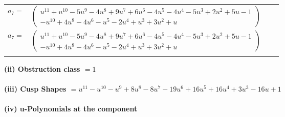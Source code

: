 \documentclass[1p]{elsarticle_modified}
\theoremstyle{definition}
\begin{document}
\begin{tabular}{m{7pt} m{180pt} m{7pt} m{180pt} }
\flushright $a_{7}=$&$\begin{pmatrix}u^{11}+u^{10}-5 u^9-4 u^8+9 u^7+6 u^6-4 u^5-4 u^4-5 u^3+2 u^2+5 u-1\\- u^{10}+4 u^8-4 u^6- u^5-2 u^4+u^3+3 u^2+u\end{pmatrix}$\\ \flushright $a_{7}=$&$\begin{pmatrix}u^{11}+u^{10}-5 u^9-4 u^8+9 u^7+6 u^6-4 u^5-4 u^4-5 u^3+2 u^2+5 u-1\\- u^{10}+4 u^8-4 u^6- u^5-2 u^4+u^3+3 u^2+u\end{pmatrix}$\\&\end{tabular}
\flushleft \textbf{(ii) Obstruction class $= 1$}\\~\\
\flushleft \textbf{(iii) Cusp Shapes $= u^{11}- u^{10}- u^9+8 u^8-8 u^7-19 u^6+16 u^5+16 u^4+3 u^3-16 u+1$}\\~\\
\newpage\renewcommand{\arraystretch}{1}
\flushleft \textbf{(iv) u-Polynomials at the component}\newline \\
\end{document}
